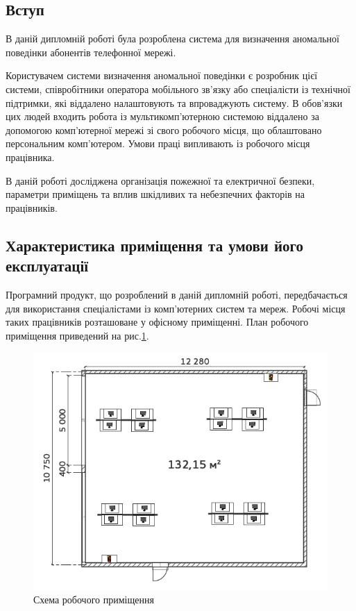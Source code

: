 \newpage
{}
\subsection{Вступ}

    В даній дипломній роботі була розроблена система для визначення аномальної поведінки абонентів телефонної мережі.

    Користувачем системи визначення аномальної поведінки є розробник цієї системи, співробітники оператора мобільного зв'язку або спеціалісти із технічної підтримки, які віддалено налаштовують та впроваджують систему. В обов'язки цих людей входить робота із мультикомп'ютерною системою віддалено за допомогою комп'ютерної мережі зі свого робочого місця, що облаштовано персональним комп'ютером. Умови праці випливають із робочого місця працівника.

    В даній роботі досліджена організація пожежної та електричної безпеки, параметри приміщень та вплив шкідливих та небезпечних факторів на працівників.
    
\subsection{Характеристика приміщення та умови його експлуатації}
    Програмний продукт, що розроблений в даній дипломній роботі, передбачається для використання спеціалістами із комп'ютерних систем та мереж. Робочі місця таких працівників розташоване у офісному приміщенні. План робочого приміщення приведений на рис.\ref{fig:lab-plan}.
    \begin{figure}[h!]
            \begin{center}
                \includegraphics[scale=0.7]{labour/lab-plan.png}
            \end{center}
            \caption{Схема робочого приміщення}
            \label{fig:lab-plan}
    \end{figure}

